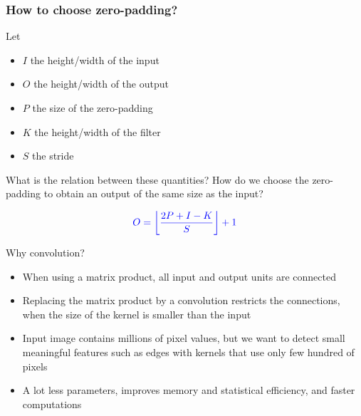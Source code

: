 \begin{frame}
	\frametitle{How to choose zero-padding?}

	Let

	\smallskip

	\begin{itemize}
		\item $I$ the height/width of the input

		\smallskip

		\item $O$ the height/width of the output

		\smallskip

		\item $P$ the size of the zero-padding

		\smallskip

		\item $K$ the height/width of the filter

		\smallskip

		\item $S$ the stride
	\end{itemize}

	\medskip

	What is the relation between these quantities? How do we choose the zero-padding to obtain an output of the same size as the input?

	\pause

	\bigskip

	$$
	\textcolor{blue}{O = \left\lfloor \frac{2P + I - K}{S} \right\rfloor + 1}
	$$


\end{frame}


\begin{frame}{Why convolution?}
	\begin{itemize}
		\item When using a matrix product, all input and output units are connected

		\medskip

		\item Replacing the matrix product by a convolution restricts the connections, when the size of the kernel is smaller than the input

		\medskip

		\item Input image contains millions of pixel values, but we want to detect small meaningful features such as edges with kernels that use only few hundred of pixels

		\medskip

		\item A lot less parameters, improves memory and statistical efficiency, and faster computations
	\end{itemize}
\end{frame}


